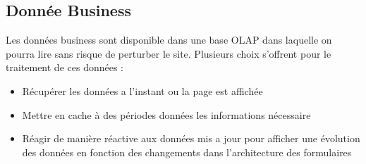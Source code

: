 \subsection{Donnée Business}
Les données business sont disponible dans une base OLAP dans laquelle on pourra lire sans risque de perturber le site. Plusieurs choix s'offrent pour le traitement de ces données :

\begin{itemize}
\item Récupérer les données a l’instant ou la page est affichée 
\item Mettre en cache à des périodes données les informations nécessaire
\item Réagir de manière réactive aux données mis a jour pour afficher une évolution des données en fonction des changements dans l’architecture des formulaires
\end{itemize}